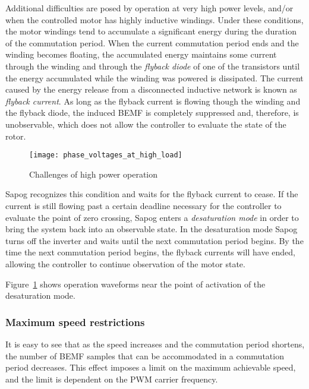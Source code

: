 \documentclass{zubaxdoc}
\begin{document}
	Additional difficulties are posed by operation at very high power levels,
	and/or when the controlled motor has highly inductive windings.
	Under these conditions, the motor windings tend to accumulate a significant energy during the duration
	of the commutation period.
	When the current commutation period ends and the winding becomes floating,
	the accumulated energy maintains some current through the winding and through the \emph{flyback diode}
	of one of the transistors until the energy accumulated while the winding was powered is dissipated.
	The current caused by the energy release from a disconnected inductive network is known as
	\emph{flyback current}.
	As long as the flyback current is flowing though the winding and the flyback diode,
	the induced BEMF is completely suppressed and, therefore,
	is unobservable, which does not allow the controller to evaluate the state of the rotor.
	
	\begin{figure}[hbtp]
		\centering
		\texttt{[image: phase\_voltages\_at\_high\_load]}
		\caption{Challenges of high power operation
			\label{phase_voltages_at_high_load}}
	\end{figure}
	
	Sapog recognizes this condition and waits for the flyback current to cease.
	If the current is still flowing past a certain deadline necessary for the controller to evaluate the
	point of zero crossing, Sapog enters a \emph{desaturation mode} in order to bring the system
	back into an observable state.
	In the desaturation mode Sapog turns off the inverter and waits until the next commutation period begins.
	By the time the next commutation period begins, the flyback currents will have ended,
	allowing the controller to continue observation of the motor state.
	
	Figure~\ref{phase_voltages_at_high_load} shows operation waveforms near the point of activation
	of the desaturation mode.
	
	\subsubsection{Maximum speed restrictions}
	
	It is easy to see that as the speed increases and the commutation period shortens,
	the number of BEMF samples that can be accommodated in a commutation period decreases.
	This effect imposes a limit on the maximum achievable speed,
	and the limit is dependent on the PWM carrier frequency.
	
\end{document}
